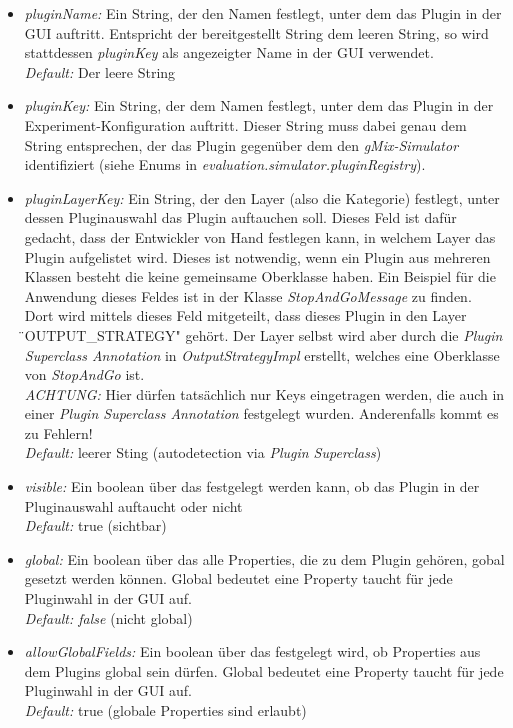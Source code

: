 \documentclass[a4paper, 11pt]{article} %
\begin{document}
\begin{itemize}
	\item \emph{pluginName:} Ein String, der den Namen festlegt, unter dem das Plugin in der GUI auftritt. Entspricht der bereitgestellt String dem leeren String, so wird stattdessen \emph{pluginKey} als angezeigter Name in der GUI verwendet.\\
	\emph{Default:} Der leere String
	\item \emph{pluginKey:} Ein String, der dem Namen festlegt, unter dem das Plugin in der Experiment-Konfiguration auftritt. Dieser String muss dabei genau dem String entsprechen, der das Plugin gegenüber dem den \emph{gMix-Simulator} identifiziert (siehe Enums in \emph{evaluation.simulator.pluginRegistry}).
	\item \emph{pluginLayerKey:} Ein String, der den Layer (also die Kategorie) festlegt, unter dessen Pluginauswahl das Plugin auftauchen soll. Dieses Feld ist dafür gedacht, dass der Entwickler von Hand festlegen kann, in welchem Layer das Plugin aufgelistet wird. Dieses ist notwendig, wenn ein Plugin aus mehreren Klassen besteht die keine gemeinsame Oberklasse haben. Ein Beispiel für die Anwendung dieses Feldes ist in der Klasse \emph{StopAndGoMessage} zu finden. Dort wird mittels dieses Feld mitgeteilt, dass dieses Plugin in den Layer \"{}OUTPUT\_STRATEGY" gehört. Der Layer selbst wird aber durch die \emph{Plugin Superclass Annotation} in \emph{OutputStrategyImpl} erstellt, welches eine Oberklasse von \emph{StopAndGo} ist. \\
	\emph{ACHTUNG:} Hier dürfen tatsächlich nur Keys eingetragen werden, die auch in einer \emph{Plugin Superclass Annotation} festgelegt wurden. Anderenfalls kommt es zu Fehlern!\\
	\emph{Default:} leerer Sting (autodetection via \emph{Plugin Superclass})
	\item \emph{visible:}	Ein boolean über das festgelegt werden kann, ob das Plugin in der Pluginauswahl auftaucht oder nicht\\
	\emph{Default:} true (sichtbar)
	\item \emph{global:} Ein boolean über das alle Properties, die zu dem Plugin gehören, gobal gesetzt werden können. Global bedeutet eine Property taucht für jede Pluginwahl in der GUI auf.\\
	\emph{Default: false} (nicht global)
	\item \emph{allowGlobalFields:} Ein boolean über das festgelegt wird, ob Properties aus dem Plugins global sein dürfen. Global bedeutet eine Property taucht für jede Pluginwahl in der GUI auf.\\
	\emph{Default:} true (globale Properties sind erlaubt)
\end{itemize}
\end{document}

